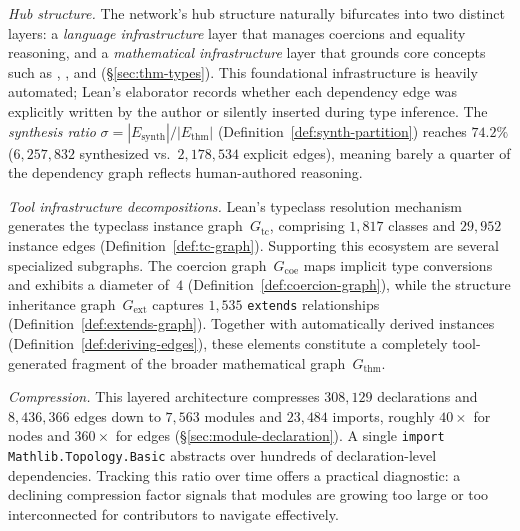 \emph{Hub structure.}
The network's hub structure naturally bifurcates into two distinct layers: a \emph{language infrastructure} layer that manages coercions and equality reasoning, and a \emph{mathematical infrastructure} layer that grounds core concepts such as , , and  (\S\ref{sec:thm-types}). This foundational infrastructure is heavily automated; Lean's elaborator records whether each dependency edge was explicitly written by the author or silently inserted during type inference. The \emph{synthesis ratio} $\sigma = |E_{\mathrm{synth}}|/|E_{\mathrm{thm}}|$ (Definition~\ref{def:synth-partition}) reaches $74.2\%$ ($6{,}257{,}832$ synthesized vs.\ $2{,}178{,}534$ explicit edges), meaning barely a quarter of the dependency graph reflects human-authored reasoning.

\emph{Tool infrastructure decompositions.}
Lean's typeclass resolution mechanism generates the typeclass instance graph~$G_{\mathrm{tc}}$, comprising $1{,}817$ classes and $29{,}952$ instance edges (Definition~\ref{def:tc-graph}). Supporting this ecosystem are several specialized subgraphs. The coercion graph~$G_{\mathrm{coe}}$ maps implicit type conversions and exhibits a diameter of~$4$ (Definition~\ref{def:coercion-graph}), while the structure inheritance graph~$G_{\mathrm{ext}}$ captures $1{,}535$ \texttt{extends} relationships (Definition~\ref{def:extends-graph}). Together with automatically derived instances (Definition~\ref{def:deriving-edges}), these elements constitute a completely tool-generated fragment of the broader mathematical graph~$G_{\mathrm{thm}}$.

\emph{Compression.}
This layered architecture compresses $308{,}129$ declarations and $8{,}436{,}366$ edges down to $7{,}563$ modules and $23{,}484$ imports, roughly $40\times$ for nodes and $360\times$ for edges (\S\ref{sec:module-declaration}). A single \texttt{import Mathlib.Topology.Basic} abstracts over hundreds of declaration-level dependencies. Tracking this ratio over time offers a practical diagnostic: a declining compression factor signals that modules are growing too large or too interconnected for contributors to navigate effectively.

